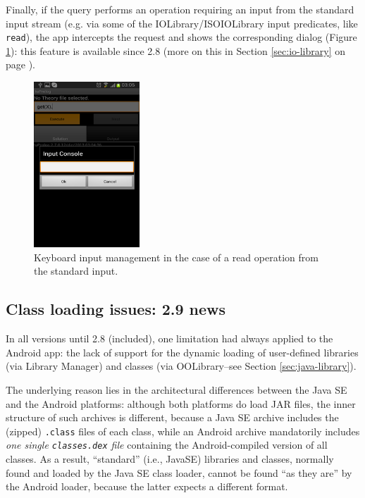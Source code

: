Finally, if the query performs an operation requiring an input from the standard input stream (e.g. via some of the IOLibrary/ISOIOLibrary input predicates, like \texttt{read}), the app intercepts the request and shows the corresponding dialog (Figure \ref{fig:android9}): this feature is available since \tuprolog{} 2.8 (more on this in Section \ref{sec:io-library} on page \pageref{sec:io-library}).

\begin{figure}
\centering
  \includegraphics[width=150px]{images/android9.png}
  \caption{Keyboard input management in the case of a read operation from the standard input.}\label{fig:android9}
\end{figure}

\subsection{Class loading issues: \tuprolog{} 2.9 news}
\label{ssec:android-classloading-issues}

In all \tuprolog{} versions until 2.8 (included), one limitation had always applied to the Android app: the lack of support for the dynamic loading of user-defined libraries (via Library Manager) and classes (via OOLibrary--see Section \ref{sec:java-library}).

The underlying reason lies in the architectural differences between the Java SE and the Android platforms: although both platforms do load JAR files, the inner structure of such archives is different, because a Java SE archive includes the (zipped) \texttt{.class} files of each class, while an Android archive mandatorily includes \textit{one single \texttt{classes.dex} file} containing the Android-compiled version of all classes.
As a result, ``standard'' (i.e., JavaSE) libraries and classes, normally found and loaded by the Java SE class loader, cannot be found ``as they are'' by the Android loader, because the latter expects a different format.

